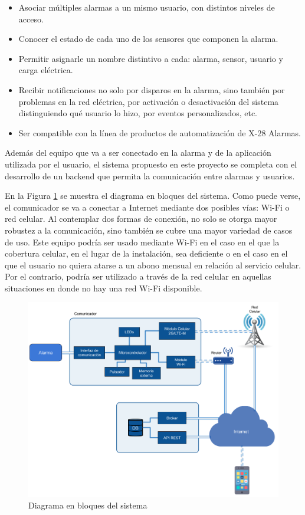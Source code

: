 \documentclass[
11pt, %
]{charter}
\begin{document}
\begin{itemize}
	\item Asociar múltiples alarmas a un mismo usuario, con distintos niveles de acceso.
	\item Conocer el estado de cada uno de los sensores que componen la alarma.
	\item Permitir asignarle un nombre distintivo a cada: alarma, sensor, usuario y carga eléctrica.
	\item Recibir notificaciones no solo por disparos en la alarma, sino también por problemas en la red eléctrica, por activación o desactivación del sistema distinguiendo qué usuario lo hizo, por eventos personalizados, etc.
	\item Ser compatible con la línea de productos de automatización de X-28 Alarmas.
\end{itemize}

Además del equipo que va a ser conectado en la alarma y de la aplicación utilizada por el usuario, el sistema propuesto en este proyecto se completa con el desarrollo de un backend que permita la comunicación entre alarmas y usuarios. 

En la Figura \ref{fig:diagBloques} se muestra el diagrama en bloques del sistema. Como puede verse, el comunicador se va a conectar a Internet mediante dos posibles vías: Wi-Fi o red celular. Al contemplar dos formas de conexión, no solo se otorga mayor robustez a la comunicación, sino también se cubre una mayor variedad de casos de uso. Este equipo podría ser usado mediante Wi-Fi en el caso en el que la cobertura celular, en el lugar de la instalación, sea deficiente o en el caso en el que el usuario no quiera atarse a un abono mensual en relación al servicio celular. Por el contrario, podría ser utilizado a través de la red celular en aquellas situaciones en donde no hay una red Wi-Fi disponible.


\begin{figure}[htpb]
\centering 
\includegraphics[width=\textwidth]{./Figuras/diagBloques.png}
\caption{Diagrama en bloques del sistema}
\label{fig:diagBloques}
\end{figure}
\end{document}

